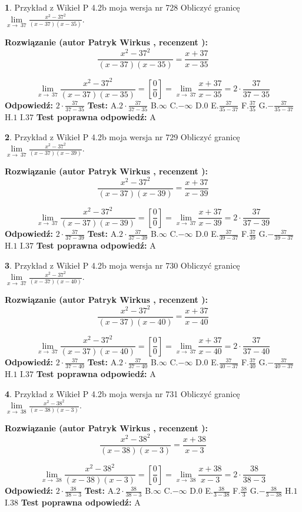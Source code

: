 \documentclass[12pt, a4paper]{article}
\theoremstyle{definition} %
\newtheorem{zad}{}
\newcommand{\zadStart}[1]{\begin{zad}#1\newline}
\newcommand{\zadStop}{\end{zad}}
\newcommand{\rozwStart}[2]{\noindent \textbf{Rozwiązanie (autor #1 , recenzent #2): }\newline}
\newcommand{\rozwStop}{\newline}
\newcommand{\odpStart}{\noindent \textbf{Odpowiedź:}\newline}
\newcommand{\odpStop}{\newline}
\newcommand{\testStart}{\noindent \textbf{Test:}\newline}
\newcommand{\testStop}{\newline}
\newcommand{\kluczStart}{\noindent \textbf{Test poprawna odpowiedź:}\newline}
\newcommand{\kluczStop}{\newline}
\begin{document}
\zadStart{Przykład z Wikieł P 4.2b moja wersja nr 728}
Obliczyć granicę $\lim\limits_{x\to\ 37}\frac{x^{2}-37^{2}}{(x-37)(x-35)}$.
\zadStop
\rozwStart{Patryk Wirkus}{}
$$\frac{x^{2}-37^{2}}{(x-37)(x-35)}=\frac{x+37}{x-35}$$

$$\lim\limits_{x\to\ 37}\frac{x^{2}-37^{2}}{(x-37)(x-35)}=[\frac{0}{0}]=\lim\limits_{x\to\ 37}\frac{x+37}{x-35}=2 \cdot \frac{37}{37-35}$$
\rozwStop
\odpStart
$2 \cdot \frac{37}{37-35}$
\odpStop
\testStart
A.$2 \cdot \frac{37}{37-35}$
B.$\infty$
C.$-\infty$
D.$0$
E.$\frac{37}{35-37}$
F.$\frac{37}{35}$
G.$-\frac{37}{35-37}$
H.$1$
I.$37$
\testStop
\kluczStart
A
\kluczStop



\zadStart{Przykład z Wikieł P 4.2b moja wersja nr 729}
Obliczyć granicę $\lim\limits_{x\to\ 37}\frac{x^{2}-37^{2}}{(x-37)(x-39)}$.
\zadStop
\rozwStart{Patryk Wirkus}{}
$$\frac{x^{2}-37^{2}}{(x-37)(x-39)}=\frac{x+37}{x-39}$$

$$\lim\limits_{x\to\ 37}\frac{x^{2}-37^{2}}{(x-37)(x-39)}=[\frac{0}{0}]=\lim\limits_{x\to\ 37}\frac{x+37}{x-39}=2 \cdot \frac{37}{37-39}$$
\rozwStop
\odpStart
$2 \cdot \frac{37}{37-39}$
\odpStop
\testStart
A.$2 \cdot \frac{37}{37-39}$
B.$\infty$
C.$-\infty$
D.$0$
E.$\frac{37}{39-37}$
F.$\frac{37}{39}$
G.$-\frac{37}{39-37}$
H.$1$
I.$37$
\testStop
\kluczStart
A
\kluczStop



\zadStart{Przykład z Wikieł P 4.2b moja wersja nr 730}
Obliczyć granicę $\lim\limits_{x\to\ 37}\frac{x^{2}-37^{2}}{(x-37)(x-40)}$.
\zadStop
\rozwStart{Patryk Wirkus}{}
$$\frac{x^{2}-37^{2}}{(x-37)(x-40)}=\frac{x+37}{x-40}$$

$$\lim\limits_{x\to\ 37}\frac{x^{2}-37^{2}}{(x-37)(x-40)}=[\frac{0}{0}]=\lim\limits_{x\to\ 37}\frac{x+37}{x-40}=2 \cdot \frac{37}{37-40}$$
\rozwStop
\odpStart
$2 \cdot \frac{37}{37-40}$
\odpStop
\testStart
A.$2 \cdot \frac{37}{37-40}$
B.$\infty$
C.$-\infty$
D.$0$
E.$\frac{37}{40-37}$
F.$\frac{37}{40}$
G.$-\frac{37}{40-37}$
H.$1$
I.$37$
\testStop
\kluczStart
A
\kluczStop



\zadStart{Przykład z Wikieł P 4.2b moja wersja nr 731}
Obliczyć granicę $\lim\limits_{x\to\ 38}\frac{x^{2}-38^{2}}{(x-38)(x-3)}$.
\zadStop
\rozwStart{Patryk Wirkus}{}
$$\frac{x^{2}-38^{2}}{(x-38)(x-3)}=\frac{x+38}{x-3}$$

$$\lim\limits_{x\to\ 38}\frac{x^{2}-38^{2}}{(x-38)(x-3)}=[\frac{0}{0}]=\lim\limits_{x\to\ 38}\frac{x+38}{x-3}=2 \cdot \frac{38}{38-3}$$
\rozwStop
\odpStart
$2 \cdot \frac{38}{38-3}$
\odpStop
\testStart
A.$2 \cdot \frac{38}{38-3}$
B.$\infty$
C.$-\infty$
D.$0$
E.$\frac{38}{3-38}$
F.$\frac{38}{3}$
G.$-\frac{38}{3-38}$
H.$1$
I.$38$
\testStop
\kluczStart
A
\kluczStop
\end{document}
